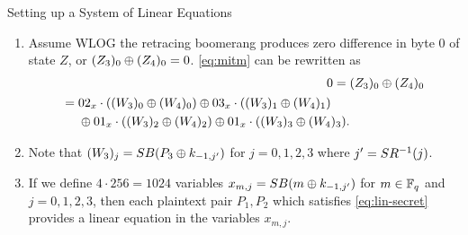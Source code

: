 \documentclass[notheorems]{beamer}
\theoremstyle{definition}
\theoremstyle{example}
\begin{document}
    \begin{frame}[<+->]{Setting up a System of Linear Equations}
        \begin{enumerate}
            \item Assume WLOG the retracing boomerang produces zero difference
            in byte 0 of state \(Z\), or \((Z_3)_0 \oplus (Z_4)_0 =
            0\). \eqref{eq:mitm} can be rewritten as
            \begin{align}
                0 ={}&(Z_3)_0 \oplus (Z_4)_0 \\
                \begin{split}
                    ={}& 02_x \cdot ((W_3)_0 \oplus (W_4)_0) \oplus 03_x \cdot ((W_3)_1 \oplus (W_4)_1) \\
                    &\oplus 01_x \cdot ((W_3)_2 \oplus (W_4)_2) \oplus 01_x \cdot ((W_3)_3 \oplus (W_4)_3).
                \end{split}
                \label{eq:lin-secret}
            \end{align}
            \item Note that \((W_3)_j = SB(P_3 \oplus k_{-1,
            j^\prime})\) for \(j = 0, 1, 2, 3\) where \(j^\prime =
            SR^{-1}(j)\).
            \item If we define \(4 \cdot 256 = 1024\) variables \(x_{m,j} =
            SB(m \oplus k_{-1, j^\prime})\) for \(m \in \mathbb F_q\) and \(j =
            0, 1, 2, 3\), then each plaintext pair \(P_1, P_2\) which satisfies
            \eqref{eq:lin-secret} provides a linear equation in the variables
            \(x_{m,j}\).
            \seti
        \end{enumerate}    
    \end{frame}
\end{document}
